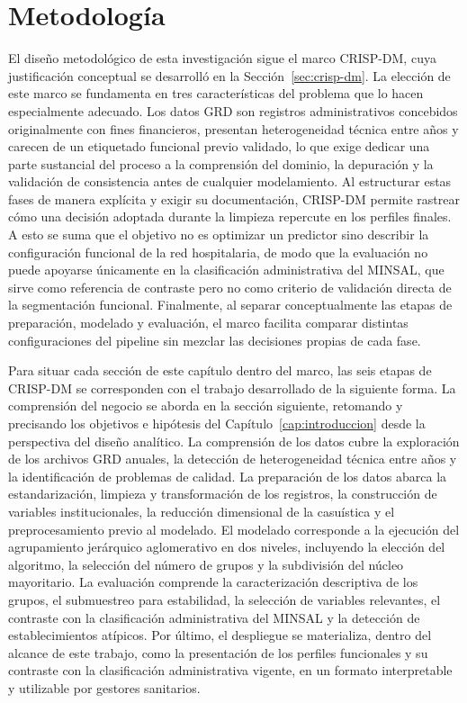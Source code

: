 \chapter{Metodología}
\label{cap:metodologia}

El diseño metodológico de esta investigación sigue el marco CRISP-DM, cuya
justificación conceptual se desarrolló en la Sección~\ref{sec:crisp-dm}. La
elección de este marco se fundamenta en tres características del problema que lo
hacen especialmente adecuado. Los datos GRD son registros administrativos
concebidos originalmente con fines financieros, presentan heterogeneidad técnica
entre años y carecen de un etiquetado funcional previo validado, lo que exige
dedicar una parte sustancial del proceso a la comprensión del dominio, la
depuración y la validación de consistencia antes de cualquier modelamiento. Al
estructurar estas fases de manera explícita y exigir su documentación, CRISP-DM
permite rastrear cómo una decisión adoptada durante la limpieza repercute en los
perfiles finales. A esto se suma que el objetivo  no es optimizar un
predictor sino describir la configuración funcional de la red hospitalaria, de
modo que la evaluación no puede apoyarse únicamente en la clasificación
administrativa del MINSAL, que sirve como referencia de contraste pero no como
criterio de validación directa de la segmentación funcional. Finalmente, al separar conceptualmente las etapas de
preparación, modelado y evaluación, el marco facilita comparar distintas
configuraciones del pipeline sin mezclar las decisiones propias de cada fase.

Para situar cada sección de este capítulo dentro del marco, las seis etapas de
CRISP-DM se corresponden con el trabajo desarrollado de la siguiente forma. La
comprensión del negocio se aborda en la sección siguiente,
retomando y precisando los objetivos e hipótesis del Capítulo~\ref{cap:introduccion}
desde la perspectiva del diseño analítico. La comprensión de los datos cubre la
exploración de los archivos GRD anuales, la detección de heterogeneidad técnica
entre años y la identificación de problemas de calidad. La preparación de los
datos abarca la estandarización, limpieza y transformación de los registros, la
construcción de variables institucionales, la reducción dimensional de la
casuística y el preprocesamiento previo al modelado. El modelado corresponde a la
ejecución del agrupamiento jerárquico aglomerativo en dos niveles, incluyendo la
elección del algoritmo, la selección del número de grupos y la subdivisión del
núcleo mayoritario. La evaluación comprende la caracterización descriptiva de los
grupos, el submuestreo para estabilidad, la selección de variables relevantes, el
contraste con la clasificación administrativa del MINSAL y la detección de
establecimientos atípicos. Por último, el despliegue se materializa, dentro del
alcance de este trabajo, como la presentación de los perfiles funcionales y su
contraste con la clasificación administrativa vigente, en un formato interpretable
y utilizable por gestores sanitarios.

